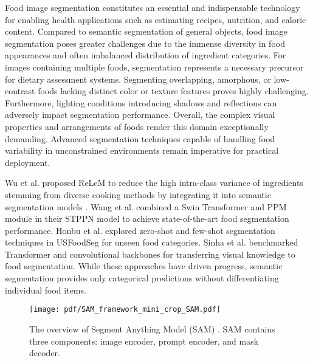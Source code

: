 \documentclass[lettersize,journal]{IEEEtran}
\begin{document}
Food image segmentation constitutes an essential and indispensable technology for enabling health applications such as estimating recipes, nutrition\cite{MIN2022100484}, and caloric content\cite{min2023large}. 
Compared to semantic segmentation of general objects, food image segmentation poses greater challenges due to the immense diversity in food appearances \cite{Min-ISIA-500-MM2020} and often imbalanced distribution \cite{klotz2021fine} of ingredient categories. 
For images containing multiple foods, segmentation represents a necessary precursor for dietary assessment systems. 
Segmenting overlapping, amorphous, or low-contrast foods lacking distinct color or texture features proves highly challenging. 
Furthermore, lighting conditions introducing shadows and reflections can adversely impact segmentation performance. 
Overall, the complex visual properties and arrangements of foods render this domain exceptionally demanding. 
Advanced segmentation techniques capable of handling food variability in unconstrained environments remain imperative for practical deployment.

Wu et al. \cite{wu2021large} proposed ReLeM to reduce the high intra-class variance of ingredients stemming from diverse cooking methods by integrating it into semantic segmentation models \cite{zheng2021rethinking,huang2019ccnet}.
Wang et al. \cite{wang2022swin} combined a Swin Transformer and PPM module in their STPPN model to achieve state-of-the-art food segmentation performance. 
Honbu et al. \cite{honbu2022unseen} explored zero-shot and few-shot segmentation techniques in USFoodSeg for unseen food categories. 
Sinha et al. \cite{sinha2023transferring} benchmarked Transformer and convolutional backbones for transferring visual knowledge to food segmentation. 
While these approaches have driven progress, semantic segmentation provides only categorical predictions without differentiating individual food items. 


\begin{figure*}[tbh]
\centering
\newpage
\texttt{[image: pdf/SAM\_framework\_mini\_crop\_SAM.pdf]}
\caption{The overview of Segment Anything Model (SAM) \cite{kirillov2023segment}. SAM contains three components: image encoder, prompt encoder, and mask decoder. }
\label{SAM pipeline}
\end{figure*}
\end{document}
